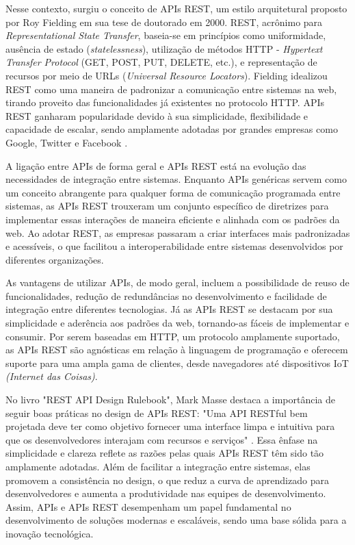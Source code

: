 Nesse contexto, surgiu o conceito de APIs REST, um estilo arquitetural proposto por Roy Fielding em sua tese de doutorado em 2000. REST, acrônimo para \textit{Representational State Transfer}, baseia-se em princípios como uniformidade, ausência de estado (\textit{statelessness}), utilização de métodos HTTP - \textit{Hypertext Transfer Protocol} (GET, POST, PUT, DELETE, etc.), e representação de recursos por meio de URLs (\textit{Universal Resource Locators}). Fielding idealizou REST como uma maneira de padronizar a comunicação entre sistemas na web, tirando proveito das funcionalidades já existentes no protocolo HTTP. APIs REST ganharam popularidade devido à sua simplicidade, flexibilidade e capacidade de escalar, sendo amplamente adotadas por grandes empresas como Google, Twitter e Facebook \cite{fielding2000}.

A ligação entre APIs de forma geral e APIs REST está na evolução das necessidades de integração entre sistemas. Enquanto APIs genéricas servem como um conceito abrangente para qualquer forma de comunicação programada entre sistemas, as APIs REST trouxeram um conjunto específico de diretrizes para implementar essas interações de maneira eficiente e alinhada com os padrões da web. Ao adotar REST, as empresas passaram a criar interfaces mais padronizadas e acessíveis, o que facilitou a interoperabilidade entre sistemas desenvolvidos por diferentes organizações.

As vantagens de utilizar APIs, de modo geral, incluem a possibilidade de reuso de funcionalidades, redução de redundâncias no desenvolvimento e facilidade de integração entre diferentes tecnologias. Já as APIs REST se destacam por sua simplicidade e aderência aos padrões da web, tornando-as fáceis de implementar e consumir. Por serem baseadas em HTTP, um protocolo amplamente suportado, as APIs REST são agnósticas em relação à linguagem de programação e oferecem suporte para uma ampla gama de clientes, desde navegadores até dispositivos IoT \textit{(Internet das Coisas)}.

No livro "REST API Design Rulebook", Mark Masse destaca a importância de seguir boas práticas no design de APIs REST: "Uma API RESTful bem projetada deve ter como objetivo fornecer uma interface limpa e intuitiva para que os desenvolvedores interajam com recursos e serviços" \cite{masse2011rest}. Essa ênfase na simplicidade e clareza reflete as razões pelas quais APIs REST têm sido tão amplamente adotadas. Além de facilitar a integração entre sistemas, elas promovem a consistência no design, o que reduz a curva de aprendizado para desenvolvedores e aumenta a produtividade nas equipes de desenvolvimento. Assim, APIs e APIs REST desempenham um papel fundamental no desenvolvimento de soluções modernas e escaláveis, sendo uma base sólida para a inovação tecnológica.

